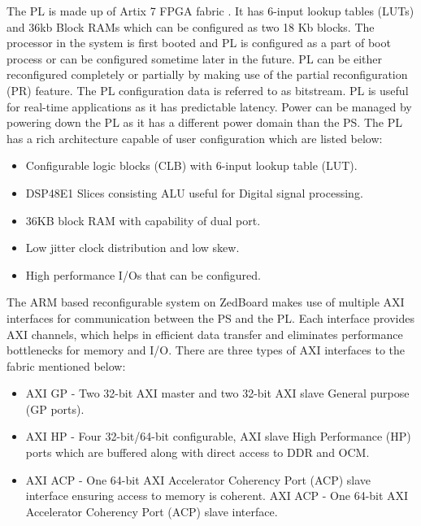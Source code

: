 The PL is made up of Artix 7 FPGA fabric \cite{13}. It has 6-input lookup tables (LUTs) and 36kb Block RAMs which can be configured as two 18 Kb blocks. The processor in the system is first booted and PL is configured as a part of boot process or can be configured sometime later in the future. PL can be either reconfigured completely or partially by making use of the partial reconfiguration (PR) feature. The PL configuration data is referred to as bitstream. PL is useful for real-time applications as it has predictable latency. Power can be managed by powering down the PL as it has a different power domain than the PS. The PL has a rich architecture capable of user configuration which are listed below:

\begin{itemize}
\item Configurable logic blocks (CLB) with 6-input lookup table (LUT).
\item DSP48E1 Slices consisting ALU useful for Digital signal processing.
\item 36KB block RAM with capability of dual port.
\item Low jitter clock distribution and low skew.
\item High performance I/Os that can be configured.
\end{itemize}

The ARM based reconfigurable system on ZedBoard makes use of multiple AXI interfaces for communication between the PS and the PL. Each interface provides AXI channels, which helps in efficient data transfer and eliminates performance bottlenecks for memory and I/O. There are three types of AXI interfaces to the fabric mentioned below:

\begin{itemize}
\item AXI GP - Two 32-bit AXI master and two 32-bit AXI slave General purpose (GP ports).
\item AXI HP - Four 32-bit/64-bit configurable, AXI slave High Performance (HP) ports which are buffered along with direct access to DDR and OCM.
\item AXI ACP - One 64-bit AXI Accelerator Coherency Port (ACP) slave interface ensuring access to memory is coherent. AXI ACP - One 64-bit AXI Accelerator Coherency Port (ACP) slave interface.
\end{itemize}


